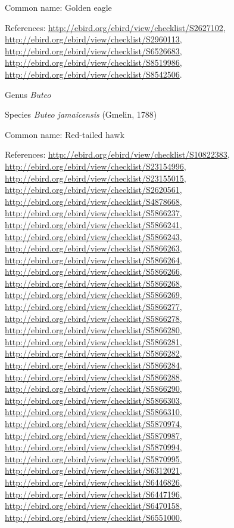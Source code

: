 \documentclass[9pt, article]{memoir}
\begin{document}
\begin{multicols}{2}
Common name: Golden eagle

References: 
\url{http://ebird.org/ebird/view/checklist/S2627102}, 
\url{http://ebird.org/ebird/view/checklist/S2960113}, 
\url{http://ebird.org/ebird/view/checklist/S6526683}, 
\url{http://ebird.org/ebird/view/checklist/S8519986}, 
\url{http://ebird.org/ebird/view/checklist/S8542506}.

\vspace{6pt}\noindent\hspace{30pt}Genus \textit{Buteo}


\vspace{6pt}\noindent\hspace{36pt}Species \textit{Buteo jamaicensis} (Gmelin, 1788)


Common name: Red-tailed hawk

References: 
\url{http://ebird.org/ebird/view/checklist/S10822383}, 
\url{http://ebird.org/ebird/view/checklist/S23154996}, 
\url{http://ebird.org/ebird/view/checklist/S23155015}, 
\url{http://ebird.org/ebird/view/checklist/S2620561}, 
\url{http://ebird.org/ebird/view/checklist/S4878668}, 
\url{http://ebird.org/ebird/view/checklist/S5866237}, 
\url{http://ebird.org/ebird/view/checklist/S5866241}, 
\url{http://ebird.org/ebird/view/checklist/S5866243}, 
\url{http://ebird.org/ebird/view/checklist/S5866263}, 
\url{http://ebird.org/ebird/view/checklist/S5866264}, 
\url{http://ebird.org/ebird/view/checklist/S5866266}, 
\url{http://ebird.org/ebird/view/checklist/S5866268}, 
\url{http://ebird.org/ebird/view/checklist/S5866269}, 
\url{http://ebird.org/ebird/view/checklist/S5866277}, 
\url{http://ebird.org/ebird/view/checklist/S5866278}, 
\url{http://ebird.org/ebird/view/checklist/S5866280}, 
\url{http://ebird.org/ebird/view/checklist/S5866281}, 
\url{http://ebird.org/ebird/view/checklist/S5866282}, 
\url{http://ebird.org/ebird/view/checklist/S5866284}, 
\url{http://ebird.org/ebird/view/checklist/S5866288}, 
\url{http://ebird.org/ebird/view/checklist/S5866290}, 
\url{http://ebird.org/ebird/view/checklist/S5866303}, 
\url{http://ebird.org/ebird/view/checklist/S5866310}, 
\url{http://ebird.org/ebird/view/checklist/S5870974}, 
\url{http://ebird.org/ebird/view/checklist/S5870987}, 
\url{http://ebird.org/ebird/view/checklist/S5870994}, 
\url{http://ebird.org/ebird/view/checklist/S5870995}, 
\url{http://ebird.org/ebird/view/checklist/S6312021}, 
\url{http://ebird.org/ebird/view/checklist/S6446826}, 
\url{http://ebird.org/ebird/view/checklist/S6447196}, 
\url{http://ebird.org/ebird/view/checklist/S6470158}, 
\url{http://ebird.org/ebird/view/checklist/S6551000}, 

\end{multicols}
\end{document}
